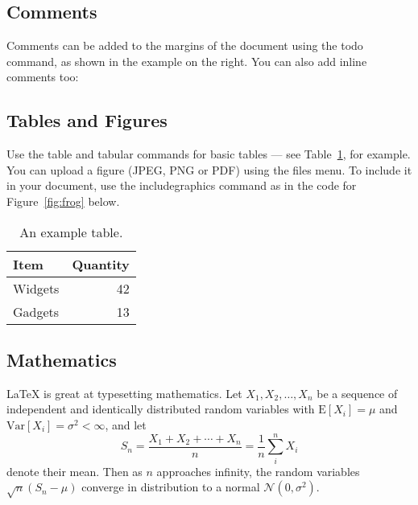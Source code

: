 	\subsection{Comments}
	
	Comments can be added to the margins of the document using the  todo command, as shown in the example on the right. You can also add inline comments too:
	
	
	\subsection{Tables and Figures}
	
	Use the table and tabular commands for basic tables --- see Table~\ref{tab:widgets}, for example. You can upload a figure (JPEG, PNG or PDF) using the files menu. To include it in your document, use the includegraphics command as in the code for Figure~\ref{fig:frog} below.
	
	\begin{figure}
		\centering
	\end{figure}
	
	\begin{table}
		\centering
		\begin{tabular}{l|r}
			Item & Quantity \\\hline
			Widgets & 42 \\
			Gadgets & 13
		\end{tabular}
		\caption{\label{tab:widgets}An example table.}
	\end{table}
	
	\subsection{Mathematics}
	
	\LaTeX{} is great at typesetting mathematics. Let $X_1, X_2, \ldots, X_n$ be a sequence of independent and identically distributed random variables with $\text{E}[X_i] = \mu$ and $\text{Var}[X_i] = \sigma^2 < \infty$, and let
	$$S_n = \frac{X_1 + X_2 + \cdots + X_n}{n}
	= \frac{1}{n}\sum_{i}^{n} X_i$$
	denote their mean. Then as $n$ approaches infinity, the random variables $\sqrt{n}(S_n - \mu)$ converge in distribution to a normal $\mathcal{N}(0, \sigma^2)$.
	

